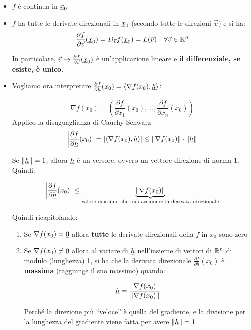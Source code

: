 \begin{itemize}
    \item \(f\) è continua in \(\underline{x}_0\)
    \item \(f\) ha tutte le derivate direzionali in \(\underline{x}_0\) (secondo tutte le direzioni \(\vec{v} \)) e si ha:
          \[\frac{\partial f}{\partial \vec{v}}(\underline{x}_0) = D_{ \vec{v} } f(\underline{x}_0) = L(\vec{v} ) \quad\forall \vec{v} \in \mathbb{R}^{n}  \]

          In particolare, \(\vec{v} \mapsto \frac{\partial f}{\partial \vec{v}}(\underline{x}_0)\) è un'applicazione lineare e \textbf{il differenziale, se esiste, è unico}.
    \item

          Vogliamo ora interpretare \(\frac{\partial f}{\partial \underline{h}}(x_0)= \langle \nabla f(x_0), \underline{h} \rangle \):

          \[
              \nabla f(x_0) = \left( \frac{\partial f}{\partial x_1}(x_0),\ldots, \frac{\partial f}{\partial x_n}(x_0) \right)
          \]
          Applico la disuguaglianza di Cauchy-Schwarz
          \[
              \left|\frac{\partial f}{\partial \underline{h}}(x_0)\right| = \left|\langle \nabla f(x_0),\underline{h} \rangle \right| \le \left\lVert \nabla f(x_0)\right\rVert \cdot \left\lVert\underline{h} \right\rVert
          \]

          Se \(\left\lVert\underline{h} \right\rVert = 1\), allora \(\underline{h} \) è un versore, ovvero un vettore direzione di norma 1. Quindi:

          \[
              \left|\frac{\partial f}{\partial \underline{h}}(x_0)\right| \le \underbrace{\left\lVert\nabla f(x_0)\right\rVert}_\text{valore massimo che può assumere la derivata direzionale}
          \]

          Quindi ricapitolando:

          \begin{enumerate}
              \item Se \(\nabla f(x_0) = \underline{0} \) allora \textbf{tutte} le derivate direzionali della \(f\) in \(x_0\) sono zero
              \item Se \(\nabla f(x_0) \neq \underline{0} \) allora al variare di \(\underline{h} \) nell'insieme di vettori di \(\mathbb{R}^{n} \) di modulo (lunghezza) 1, si ha che la derivata direzionale \(\frac{\partial f}{\partial h}(x_0)\) è \textbf{massima} (raggiunge il suo massimo) quando:

                    \[
                        \underline{h} = \frac{\nabla f(x_0)}{\left\lVert\nabla f(x_0)\right\rVert}
                    \]

                    Perché la direzione più ``veloce'' è quella del gradiente, e la divisione per la lunghezza del gradiente viene fatta per avere \(\left\lVert\underline{h}\right\rVert=1\).
          \end{enumerate}
\end{itemize}

